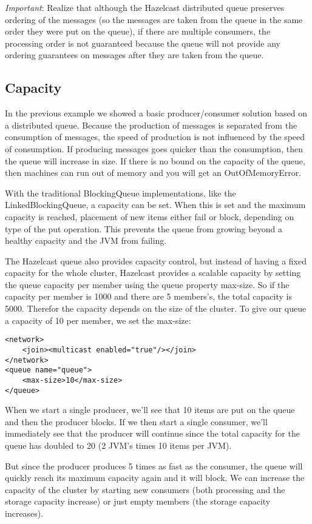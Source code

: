 \emph{Important}: Realize that although the Hazelcast distributed queue preserves ordering of the messages (so the messages are taken from the queue in the same order they were put on the queue), if there are multiple consumers, the processing order is not guaranteed because the queue will not provide any ordering guarantees on messages after they are taken from the queue.

\subsection{Capacity}
In the previous example we showed a basic producer/consumer solution based on a distributed queue. Because the production of messages is separated from the consumption of messages, the speed of production is not influenced by the speed of consumption. If producing messages goes quicker than the consumption, then the queue will increase in size. If there is no bound on the capacity of the queue, then machines can run out of memory and you will get an OutOfMemoryError. 

With the traditional BlockingQueue implementations, like the LinkedBlockingQueue, a capacity can be set. When this is set and the maximum capacity is reached, placement of new items either fail or block, depending on type of the put operation. This prevents the queue from growing beyond a healthy capacity and the JVM from failing.

The Hazelcast queue also provides capacity control, but instead of having a fixed capacity for the whole cluster, Hazelcast provides a scalable capacity by setting the queue capacity per member using the queue property max-size. So if the capacity per member is 1000 and there are 5 members's, the total capacity is 5000. Therefor the capacity depends on the size of the cluster. To give our queue a capacity of 10 per member, we set the max-size:
\begin{lstlisting}
<network>
    <join><multicast enabled="true"/></join>
</network>
<queue name="queue">
    <max-size>10</max-size>
</queue>
\end{lstlisting}
When we start a single producer, we'll see that 10 items are put on the queue and then the producer blocks. If we then start a single consumer, we'll immediately see that the producer will continue since the total capacity for the queue has doubled to 20 (2 JVM's times 10 items per JVM). 

But since the producer produces 5 times as fast as the consumer, the queue will quickly reach its maximum capacity again and it will block. We can increase the capacity of the cluster by starting new consumers (both processing and the storage capacity increase) or just empty members (the storage capacity increases).


